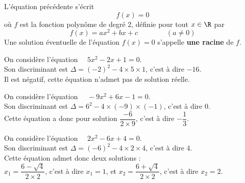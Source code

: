 \documentclass[a4paper,11pt,cours]{nsi}
\begin{document}
\begin{demonstration}
\end{demonstration}
\begin{remarque}
	L'équation précédente s'écrit $$f(x)=0$$ 
	où $f$ est la fonction polynôme de degré 2, définie pour tout $x\in\R$ par
	$$f(x)=ax^2+bx+c\qquad\qquad(a\neq 0)$$
	Une solution éventuelle de l'équation $f(x)=0$ s'appelle \textbf{une racine} de $f$.
\end{remarque}

\begin{exemple}[ 1]
	On considère l'équation $\quad 5x^2-2x+1=0$.\\
	Son discriminant est $\Delta = (-2)^2-4\times 5\times1$, c'est à dire $-16$.\\
	Il est négatif, cette équation n'admet pas de solution réelle.
\end{exemple}


\begin{exemple}[ 2]
	On considère l'équation $\quad -9x^2+6x-1=0$.\\
	Son discriminant est $\Delta = 6^2-4\times (-9)\times(-1)$, c'est à dire $0$.\\
	Cette équation a donc pour solution $\dfrac{-6}{2\times 9}$, c'est à dire $-\dfrac{1}{3}$.
\end{exemple}

\begin{exemple}[ 3]
	On considère l'équation $\quad 2x^2-6x+4=0$.\\
	Son discriminant est $\Delta = (-6)^2-4\times 2\times 4$, c'est à dire $4$.\\
	Cette équation admet donc deux solutions :\\
	$x_1=\dfrac{6-\sqrt{4}}{2\times 2}$, c'est à dire $x_1=1$, \quad	et $x_2=\dfrac{6+\sqrt{4}}{2\times 2}$, c'est 
	à dire $x_2=2$.
\end{exemple}
\end{document}
